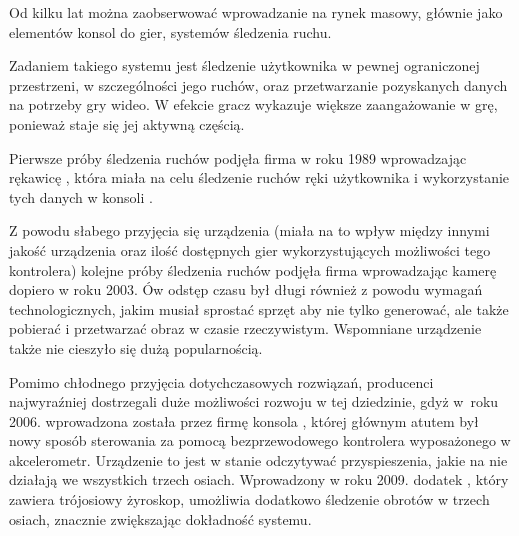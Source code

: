 \label{ch:current_state} %

Od kilku lat można zaobserwować wprowadzanie na rynek masowy, głównie jako elementów konsol do gier, systemów śledzenia ruchu.

Zadaniem takiego systemu jest śledzenie użytkownika w pewnej ograniczonej przestrzeni, w szczególności jego ruchów, oraz przetwarzanie pozyskanych danych na potrzeby gry wideo. W efekcie gracz wykazuje większe zaangażowanie w grę, ponieważ staje się jej aktywną częścią.

Pierwsze próby śledzenia ruchów podjęła firma  w roku 1989 wprowadzając rękawicę , która miała na celu śledzenie ruchów ręki użytkownika i wykorzystanie tych danych w konsoli .

Z powodu słabego przyjęcia się urządzenia (miała na to wpływ między innymi jakość urządzenia oraz ilość dostępnych gier wykorzystujących możliwości tego kontrolera) kolejne próby śledzenia ruchów podjęła firma  wprowadzając kamerę  dopiero w roku 2003. Ów odstęp czasu był długi również z powodu wymagań technologicznych, jakim musiał sprostać sprzęt aby nie tylko generować, ale także pobierać i przetwarzać obraz w czasie rzeczywistym. Wspomniane urządzenie także nie cieszyło się dużą popularnością.

Pomimo chłodnego przyjęcia dotychczasowych rozwiązań, producenci najwyraźniej dostrzegali duże możliwości rozwoju w tej dziedzinie, gdyż w~roku 2006. wprowadzona została przez firmę  konsola , której głównym atutem był nowy sposób sterowania \ppauza za pomocą bezprzewodowego kontrolera wyposażonego w akcelerometr. Urządzenie to jest w stanie odczytywać przyspieszenia, jakie na nie działają we wszystkich trzech osiach. Wprowadzony w roku 2009. dodatek , który zawiera trójosiowy żyroskop, umożliwia dodatkowo śledzenie obrotów w trzech osiach, znacznie zwiększając dokładność systemu.

